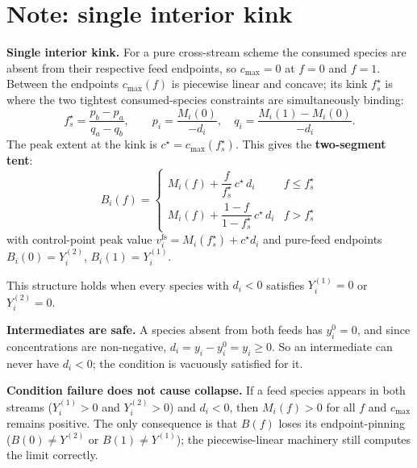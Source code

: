 \documentclass[11pt]{article}
\newcommand{\fs}{f_s^{\star}}
\begin{document}
\section*{Note: single interior kink}

\textbf{Single interior kink.} For a pure cross-stream scheme the consumed species are
absent from their respective feed endpoints, so \(c_{\max}=0\) at \(f=0\) and \(f=1\).
Between the endpoints \(c_{\max}(f)\) is piecewise linear and concave; its kink \(\fs\)
is where the two tightest consumed-species constraints are simultaneously binding:
\[
\fs = \frac{p_b - p_a}{q_a - q_b},
\qquad p_i = \frac{M_i(0)}{-d_i},\quad q_i = \frac{M_i(1)-M_i(0)}{-d_i}.
\]
The peak extent at the kink is \(c^{\star}=c_{\max}(\fs)\). This gives the
\textbf{two-segment tent}:
\[
B_i(f) = \begin{cases}
M_i(f) + \dfrac{f}{\fs}\,c^{\star}\,d_i & f \le \fs\\[8pt]
M_i(f) + \dfrac{1-f}{1-\fs}\,c^{\star}\,d_i & f > \fs
\end{cases}
\]
with control-point peak value \(v^{\mathrm{fs}}_i = M_i(\fs)+c^{\star}d_i\) and
pure-feed endpoints \(B_i(0)=Y^{(2)}_i\), \(B_i(1)=Y^{(1)}_i\).

This structure holds when every species with \(d_i<0\) satisfies \(Y^{(1)}_i=0\) or
\(Y^{(2)}_i=0\).

\textbf{Intermediates are safe.} A species absent from both feeds has \(y^0_i=0\), and
since concentrations are non-negative, \(d_i=y_i-y^0_i=y_i\ge 0\). So an intermediate
can never have \(d_i<0\); the condition is vacuously satisfied for it.

\textbf{Condition failure does not cause collapse.} If a feed species appears in both
streams (\(Y^{(1)}_i>0\) and \(Y^{(2)}_i>0\)) and \(d_i<0\), then \(M_i(f)>0\) for
all \(f\) and \(c_{\max}\) remains positive. The only consequence is that \(B(f)\)
loses its endpoint-pinning (\(B(0)\ne Y^{(2)}\) or \(B(1)\ne Y^{(1)}\)); the
piecewise-linear machinery still computes the limit correctly.
\end{document}
